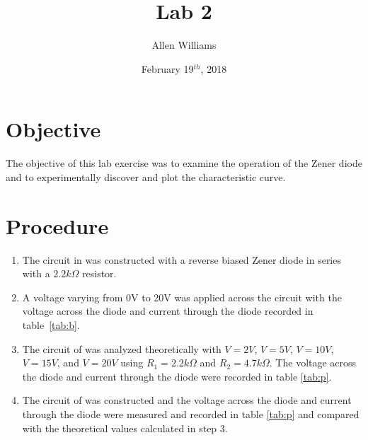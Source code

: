 \documentclass{amsart}
\title{Lab 2}
\author{Allen Williams}
\date{February 19$^{th}$, 2018}
\begin{document}
\maketitle

\section*{Objective}
  The objective of this lab exercise was to examine the operation of the Zener diode and to experimentally discover and plot the characteristic curve.
\section*{Procedure}

\begin{enumerate}
\item The circuit in  was constructed with a reverse biased Zener diode in series with a $2.2k\Omega$ resistor.  
\item A voltage varying from 0V to 20V was applied across the circuit with the voltage across the diode and current through the diode recorded in table~\ref{tab:b}.
\item The circuit of  was analyzed theoretically with $V=2V$, $V=5V$, $V=10V$, $V=15V$, and $V=20V$ using $R_1=2.2k\Omega$ and $R_2=4.7k\Omega$.  The voltage across the diode and current through the diode were recorded in table \ref{tab:p}.
\item The circuit of  was constructed and the voltage across the diode and current through the diode were measured and recorded in table \ref{tab:p} and compared with the theoretical values calculated in step 3.
\end{enumerate}
\end{document}
